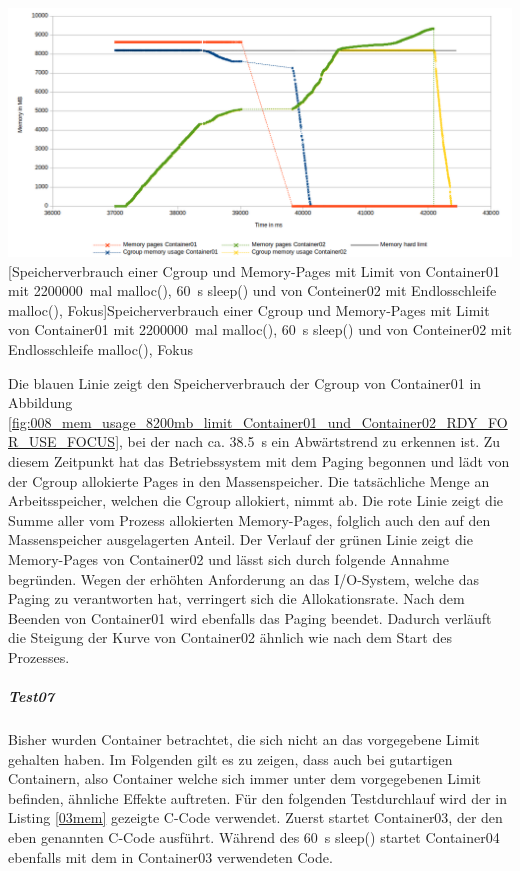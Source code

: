\vspace{1em}
\begin{minipage}{\linewidth}
	\centering
	\includegraphics[width=1\linewidth]{pics/008_mem_usage_8200mb_limit_Container01_und_Container02_RDY_FOR_USE_FOCUS.png}
	[Speicherverbrauch einer Cgroup und Memory-Pages mit Limit von Container01 mit \SI{2200000}{mal} malloc(), \SI{60}{\second} sleep() und von Conteiner02 mit Endlosschleife malloc(), Fokus]{Speicherverbrauch einer Cgroup und Memory-Pages mit Limit von Container01 mit \SI{2200000}{mal} malloc(), \SI{60}{\second} sleep() und von Conteiner02 mit Endlosschleife malloc(), Fokus}
	\label{fig:008_mem_usage_8200mb_limit_Container01_und_Container02_RDY_FOR_USE_FOCUS}
\end{minipage}
\vspace{1em}


Die blauen Linie zeigt den Speicherverbrauch der Cgroup von Container01 in Abbildung \ref{fig:008_mem_usage_8200mb_limit_Container01_und_Container02_RDY_FOR_USE_FOCUS}, bei der nach ca. \SI{38,5}{\second} ein Abwärtstrend zu erkennen ist. Zu diesem Zeitpunkt hat das Betriebssystem mit dem Paging begonnen und lädt von der Cgroup allokierte Pages in den Massenspeicher. Die tatsächliche Menge an Arbeitsspeicher, welchen die Cgroup allokiert, nimmt ab. Die rote Linie zeigt die Summe aller vom Prozess allokierten Memory-Pages, folglich auch den auf den Massenspeicher ausgelagerten Anteil. Der Verlauf der grünen Linie zeigt die Memory-Pages von Container02 und lässt sich durch folgende Annahme begründen. Wegen der erhöhten Anforderung an das I/O-System, welche das Paging zu verantworten hat, verringert sich die Allokationsrate. Nach dem Beenden von Container01 wird ebenfalls das Paging beendet. Dadurch verläuft die Steigung der Kurve von Container02 ähnlich wie nach dem Start des Prozesses. 

\subparagraph{Test07}
Bisher wurden Container betrachtet, die sich nicht an das vorgegebene Limit gehalten haben. Im Folgenden gilt es zu zeigen, dass auch bei \glqq gutartigen\grqq{}  Containern, also Container welche sich immer unter dem vorgegebenen Limit befinden, ähnliche Effekte auftreten. Für den folgenden Testdurchlauf wird der in Listing \ref{03mem} gezeigte C-Code verwendet. Zuerst startet Container03, der den eben genannten C-Code ausführt. Während des \SI{60}{\second} sleep() startet Container04 ebenfalls mit dem in Container03 verwendeten Code.

